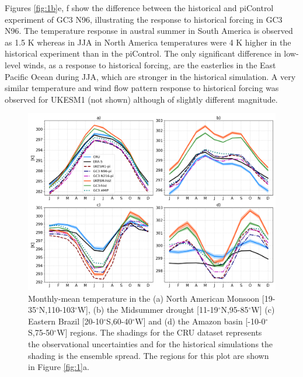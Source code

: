  Figures \ref{fig:1b}e, f show the difference between the historical and piControl experiment of GC3 N96, illustrating the response to historical forcing in GC3 N96.
 The temperature response in austral summer in South America is observed as 1.5 K whereas in JJA in North America temperatures were 4 K higher in the historical experiment than in the piControl.
 The only significant difference in low-level winds, as a response to historical forcing, are the easterlies in the East Pacific Ocean during JJA, which are stronger in the historical simulation.
  A very similar temperature and wind flow pattern response to historical forcing was observed for UKESM1 (not shown) although of slightly different magnitude. %


\begin{figure}[t!]
\centering
 \includegraphics[width=\linewidth]{figures/p2fig2_v3.png}
\caption[Seasonal cycle of surface temperature in key monsoon regions]{ Monthly-mean temperature in the (a) North American Monsoon [19-35$^\circ$N,110-103$^\circ$W], (b) the Midsummer drought [11-19$^\circ$N,95-85$^\circ$W] (c) Eastern Brazil [20-10$^\circ$S,60-40$^\circ$W] and (d) the Amazon basin [-10-0$^\circ$S,75-50$^\circ$W] regions. The shadings for the CRU dataset represents the observational uncertainties and for the historical simulations the shading is the ensemble spread. The regions for this plot are shown in Figure \ref{fig:1}a. }
\label{fig:2}
\end{figure}


